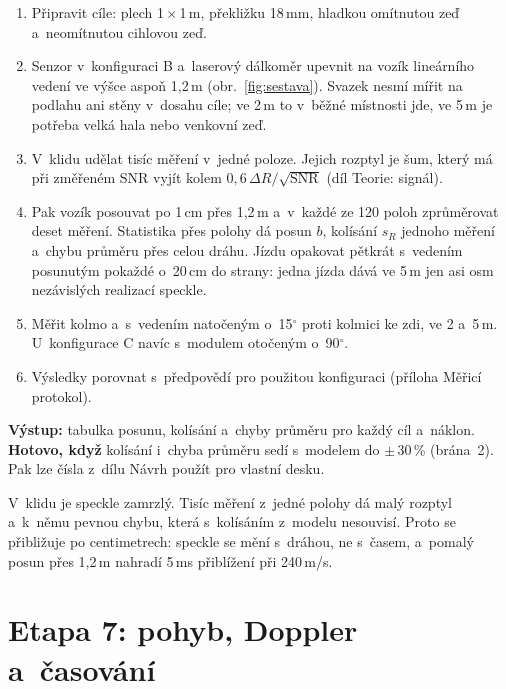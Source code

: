 \documentclass[czech]{skyren}
\begin{document}
\begin{enumerate}
\item Připravit cíle: plech 1\,$\times$\,1\,m, překližku 18\,mm, hladkou
  omítnutou zeď a~neomítnutou cihlovou zeď.
\item Senzor v~konfiguraci B a~laserový dálkoměr upevnit na vozík lineárního
  vedení ve výšce aspoň 1,2\,m (obr.~\ref{fig:sestava}). Svazek nesmí mířit
  na podlahu ani stěny v~dosahu cíle; ve 2\,m to v~běžné místnosti jde, ve
  5\,m je potřeba velká hala nebo venkovní zeď.
\item V~klidu udělat tisíc měření v~jedné poloze. Jejich rozptyl je šum,
  který má při změřeném SNR vyjít kolem $0{,}6\,\Delta R/\sqrt{\mathrm{SNR}}$
  (díl Teorie: signál).
\item Pak vozík posouvat po 1\,cm přes 1,2\,m a~v~každé ze 120 poloh
  zprůměrovat deset měření. Statistika přes polohy dá posun $b$, kolísání
  $s_R$ jednoho měření a~chybu průměru přes celou dráhu. Jízdu opakovat
  pětkrát s~vedením posunutým pokaždé o~20\,cm do strany: jedna jízda dává
  ve 5\,m jen asi osm nezávislých realizací speckle.
\item Měřit kolmo a~s~vedením natočeným o~15$^\circ$ proti kolmici ke zdi,
  ve 2 a~5\,m. U~konfigurace C navíc s~modulem otočeným o~90$^\circ$.
\item Výsledky porovnat s~předpovědí pro použitou konfiguraci (příloha Měřicí
  protokol).
\end{enumerate}

\textbf{Výstup:} tabulka posunu, kolísání a~chyby průměru pro každý cíl
a~náklon. \textbf{Hotovo, když} kolísání i~chyba průměru sedí s~modelem do
$\pm$\,30\,\% (brána~2). Pak lze čísla z~dílu Návrh použít pro vlastní
desku.

\begin{skyrengotcha}
V~klidu je speckle zamrzlý. Tisíc měření z~jedné polohy dá malý rozptyl
a~k~němu pevnou chybu, která s~kolísáním z~modelu nesouvisí. Proto se
přibližuje po centimetrech: speckle se mění s~dráhou, ne s~časem, a~pomalý
posun přes 1,2\,m nahradí 5\,ms přiblížení při 240\,m/s.
\end{skyrengotcha}

\section{Etapa 7: pohyb, Doppler a~časování}
\end{document}
